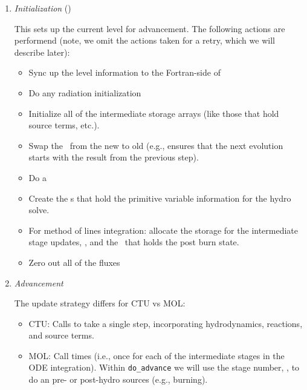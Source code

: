 \begin{enumerate}
\item {\em Initialization} ()

  This sets up the current level for advancement.  The following
  actions are performend (note, we omit the actions taken for a retry,
  which we will describe later):
  \begin{itemize}
  \item Sync up the level information to the Fortran-side of \castro

  \item Do any radiation initialization

  \item Initialize all of the intermediate storage arrays (like those
    that hold source terms, etc.).

  \item Swap the \statedata\ from the new to old (e.g., ensures that
    the next evolution starts with the result from the previous step).

  \item Do a 

  \item Create the \multifab s that hold the primitive variable information
   for the hydro solve.

  \item For method of lines integration: allocate the storage for the 
    intermediate stage updates, , and the  \multifab\
    that holds the post burn state.

  \item Zero out all of the fluxes

  \end{itemize}

      

\item {\em Advancement} 

  The update strategy differs for CTU vs MOL:
  \begin{itemize}
  \item CTU: Calls  to take a single step,
    incorporating hydrodynamics, reactions, and source terms.

  \item MOL: Call   times
    (i.e., once for each of the intermediate stages in the ODE
    integration).  Within {\tt do\_advance} we will use the stage
    number, \variable{mol\_iteration}, to do an pre- or post-hydro
    sources (e.g., burning).


\end{itemize}
\end{enumerate}
